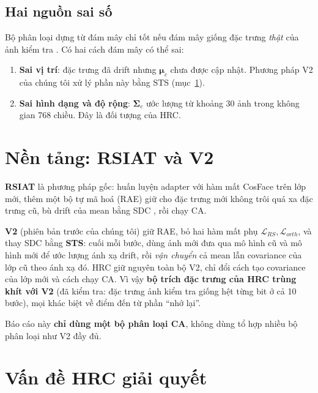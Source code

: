 \documentclass[11pt]{article}
\newcommand{\bmu}{\boldsymbol{\mu}}
\newcommand{\bSigma}{\boldsymbol{\Sigma}}
\begin{document}
\subsection{Hai nguồn sai số}
Bộ phân loại dựng từ đám mây chỉ tốt nếu đám mây giống đặc trưng \emph{thật} của ảnh kiểm tra \cite{devroye}. Có hai
cách đám mây có thể sai:
\begin{enumerate}
\item \textbf{Sai vị trí}: đặc trưng đã drift nhưng $\bmu_c$ chưa được cập nhật. Phương pháp V2 của chúng tôi xử lý
      phần này bằng STS (mục~\ref{sec:v2}).
\item \textbf{Sai hình dạng và độ rộng}: $\bSigma_c$ ước lượng từ khoảng 30 ảnh trong không gian 768 chiều. Đây là
      đối tượng của HRC.
\end{enumerate}

\section{Nền tảng: RSIAT và V2}\label{sec:v2}

\textbf{RSIAT} \cite{ssiat} là phương pháp gốc: huấn luyện adapter với hàm mất CosFace \cite{cosface} trên lớp mới,
thêm một bộ tự mã hoá (RAE) giữ cho đặc trưng mới không trôi quá xa đặc trưng cũ, bù drift của mean bằng SDC
\cite{sdc}, rồi chạy CA.

\textbf{V2} (phiên bản trước của chúng tôi) giữ RAE, bỏ hai hàm mất phụ $\mathcal{L}_{RS},\mathcal{L}_{orth}$, và thay
SDC bằng \textbf{STS}: cuối mỗi bước, dùng ảnh mới đưa qua mô hình cũ và mô hình mới để ước lượng ánh xạ drift, rồi
\emph{vận chuyển} cả mean lẫn covariance của lớp cũ theo ánh xạ đó. HRC giữ nguyên toàn bộ V2, chỉ đổi cách tạo
covariance của lớp mới và cách chạy CA. Vì vậy \textbf{bộ trích đặc trưng của HRC trùng khít với V2} (đã kiểm tra:
đặc trưng ảnh kiểm tra giống hệt từng bit ở cả 10 bước), mọi khác biệt về điểm đến từ phần ``nhớ lại''.

Báo cáo này \textbf{chỉ dùng một bộ phân loại CA}, không dùng tổ hợp nhiều bộ phân loại như V2 đầy đủ.

\section{Vấn đề HRC giải quyết}
\end{document}
